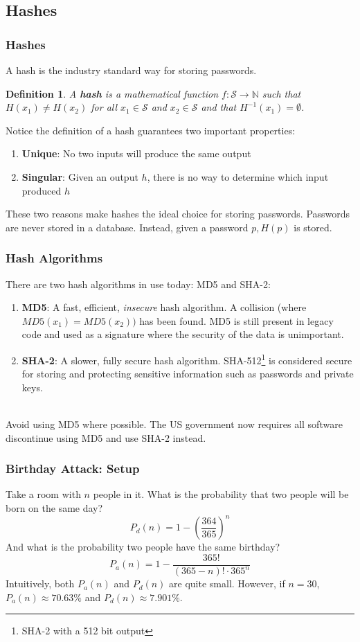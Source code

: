 \documentclass[aspectratio=169]{beamer}
\newtheorem{defn}{Definition}
\begin{document}
\subsection{Hashes}
\begin{frame}
\frametitle{Hashes}
A hash is the industry standard way for storing passwords.
\begin{defn}
A \textbf{hash} is a mathematical function $f: \mathcal{S} \rightarrow \mathbb{N}$ such that $H(x_1) \ne H(x_2)$ for all $x_1 \in \mathcal{S}$ and $x_2 \in \mathcal{S}$ and that $H^{-1}(x_1) = \emptyset$.
\end{defn}
Notice the definition of a hash guarantees two important properties:
\begin{enumerate}
	\item \textbf{Unique}: No two inputs will produce the same output
	\item \textbf{Singular}: Given an output $h$, there is no way to determine which input produced $h$
\end{enumerate}
These two reasons make hashes the ideal choice for storing passwords. Passwords are never stored in a database. Instead, given a password $p, H(p)$ is stored.
\end{frame}

\begin{frame}
\frametitle{Hash Algorithms}
There are two hash algorithms in use today: MD5 and SHA-2:
\begin{enumerate}
	\item \textbf{MD5}: A fast, efficient, \emph{insecure} hash algorithm. A collision (where $MD5(x_1) = MD5(x_2))$ has been found. MD5 is still present in legacy code and used as a signature where the security of the data is unimportant.
	\item \textbf{SHA-2}: A slower, fully secure hash algorithm. SHA-512\footnote{SHA-2 with a 512 bit output} is considered secure for storing and protecting sensitive information such as passwords and private keys.
\end{enumerate}

\mbox{}\\
Avoid using MD5 where possible. The US government now requires all software discontinue using MD5 and use SHA-2 instead.
\end{frame}

\begin{frame}
\frametitle{Birthday Attack: Setup}
Take a room with $n$ people in it. What is the probability that two people will be born on the same day?
\[P_d(n) = 1 - \left(\frac {364}{365}\right)^n\]
And what is the probability two people have the same birthday?
\[P_a(n) =  1 - \frac {365!} {(365 - n)! \cdot 365^n}\]
Intuitively, both $P_a(n)$ and $P_d(n)$ are quite small. However, if $n = 30$, $P_a(n) \approx 70.63\%$ and $P_d(n) \approx 7.901\%$.
\end{frame}
\end{document}
